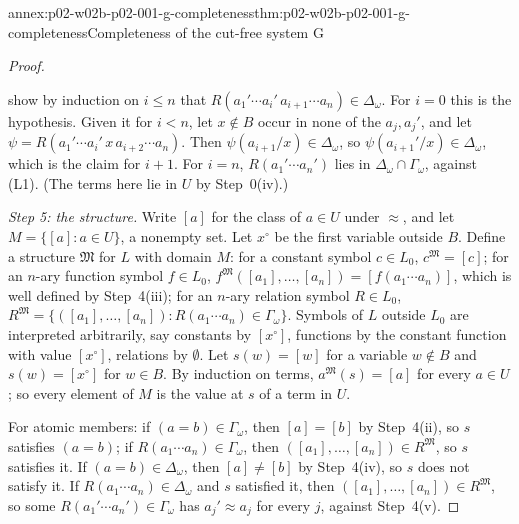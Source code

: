 \begin{annexitem}{annex:p02-w02b-p02-001-g-completeness}{thm:p02-w02b-p02-001-g-completeness}{Completeness of the cut-free system G}
\begin{proof}
\begin{enumerate}
      show by induction on \(i\leq n\) that
      \(R(a_1'\cdots a_i'\,a_{i+1}\cdots a_n)\in\Delta_\omega\).  For
      \(i=0\) this is the hypothesis.  Given it for \(i<n\), let
      \(x\notin B\) occur in none of the \(a_j,a_j'\), and let
      \(\psi=R(a_1'\cdots a_i'\,x\,a_{i+2}\cdots a_n)\).  Then
      \(\psi(a_{i+1}/x)\in\Delta_\omega\), so
      \(\psi(a_{i+1}'/x)\in\Delta_\omega\), which is the claim for
      \(i+1\).  For \(i=n\), \(R(a_1'\cdots a_n')\) lies in
      \(\Delta_\omega\cap\Gamma_\omega\), against (L1).  (The terms here lie
      in \(U\) by Step~0(iv).)
\end{enumerate}

\emph{Step 5: the structure.}  Write \([a]\) for the class of \(a\in U\)
under \(\approx\), and let \(M=\{[a]:a\in U\}\), a nonempty set.  Let
\(x^{\circ}\) be the first variable outside \(B\).  Define a structure
\(\mathfrak M\) for \(L\) with domain \(M\): for a constant symbol
\(c\in L_0\), \(c^{\mathfrak M}=[c]\); for an \(n\)-ary function symbol
\(f\in L_0\), \(f^{\mathfrak M}([a_1],\ldots,[a_n])=[f(a_1\cdots a_n)]\),
which is well defined by Step~4(iii); for an \(n\)-ary relation symbol
\(R\in L_0\), \(R^{\mathfrak M}=\{([a_1],\ldots,[a_n]):
R(a_1\cdots a_n)\in\Gamma_\omega\}\).  Symbols of \(L\) outside \(L_0\)
are interpreted arbitrarily, say constants by \([x^{\circ}]\), functions
by the constant function with value \([x^{\circ}]\), relations by
\(\emptyset\).  Let \(s(w)=[w]\) for a variable \(w\notin B\) and
\(s(w)=[x^{\circ}]\) for \(w\in B\).  By induction on terms,
\(a^{\mathfrak M}(s)=[a]\) for every \(a\in U\); so every element of \(M\)
is the value at \(s\) of a term in \(U\).

For atomic members: if \((a=b)\in\Gamma_\omega\), then \([a]=[b]\) by
Step~4(ii), so \(s\) satisfies \((a=b)\); if
\(R(a_1\cdots a_n)\in\Gamma_\omega\), then
\(([a_1],\ldots,[a_n])\in R^{\mathfrak M}\), so \(s\) satisfies it.  If
\((a=b)\in\Delta_\omega\), then \([a]\neq[b]\) by Step~4(iv), so \(s\) does
not satisfy it.  If \(R(a_1\cdots a_n)\in\Delta_\omega\) and \(s\)
satisfied it, then \(([a_1],\ldots,[a_n])\in R^{\mathfrak M}\), so some
\(R(a_1'\cdots a_n')\in\Gamma_\omega\) has \(a_j'\approx a_j\) for every
\(j\), against Step~4(v).


\end{proof}
\end{annexitem}
